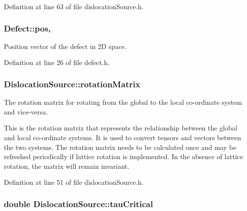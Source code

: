 Definition at line 63 of file dislocation\-Source.\-h.

\hypertarget{classDefect_aed2731c1beefc22e3db6ad5b18194cdd}{
\subsubsection[{pos}]{ Defect\-::pos\hspace{0.3cm}{\ttfamily [protected]}, {\ttfamily [inherited]}}}\label{d5/d4f/classDefect_aed2731c1beefc22e3db6ad5b18194cdd}


Position vector of the defect in 2\-D space. 



Definition at line 26 of file defect.\-h.

\hypertarget{classDislocationSource_a3bb826a0646d5c5546045cbf8d523b4f}{
\subsubsection[{rotation\-Matrix}]{ Dislocation\-Source\-::rotation\-Matrix\hspace{0.3cm}{\ttfamily [protected]}}}\label{de/de3/classDislocationSource_a3bb826a0646d5c5546045cbf8d523b4f}


The rotation matrix for rotating from the global to the local co-\/ordinate system and vice-\/versa. 

This is the rotation matrix that represents the relationship between the global and local co-\/ordinate systems. It is used to convert tensors and vectors between the two systems. The rotation matrix needs to be calculated once and may be refreshed periodically if lattice rotation is implemented. In the absence of lattice rotation, the matrix will remain invariant. 

Definition at line 51 of file dislocation\-Source.\-h.

\hypertarget{classDislocationSource_ad91294a3ab5b6f6156a2ad67b9df954e}{
\subsubsection[{tau\-Critical}]{\setlength{\rightskip}{0pt plus 5cm}double Dislocation\-Source\-::tau\-Critical\hspace{0.3cm}{\ttfamily [protected]}}}\label{de/de3/classDislocationSource_ad91294a3ab5b6f6156a2ad67b9df954e}


